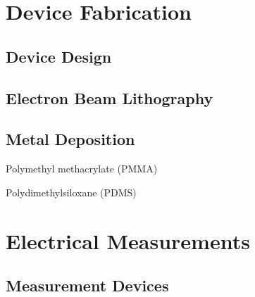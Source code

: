 \section{Device Fabrication}\label{sec:device_fabrication}
\subsection{Device Design}\label{subsec:device_design}
\subsection{Electron Beam Lithography}\label{subsec:lithography}
\subsection{Metal Deposition}\label{subsec:deposition}
Polymethyl methacrylate (PMMA)

Polydimethylsiloxane (PDMS)

\section{Electrical Measurements}\label{sec:measurements}
\subsection{Measurement Devices}\label{subsec:measurement_devices}
